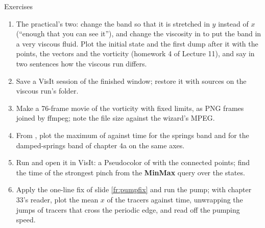 \documentclass[aspectratio=169,11pt]{beamer}
\newcommand{\gui}[1]{\textsf{\textbf{#1}}}
\begin{document}
\begin{frame}{Exercises}
\label{fr:exercises}
\small
\begin{enumerate}
  \item The practical's two: change the band so that it is stretched in $y$ instead of $x$ (``enough that you can see it''), and change the viscosity in  to put the band in a very viscous fluid. Plot the initial state and the first dump after it with the points, the vectors and the vorticity (homework 4 of Lecture 11), and say in two sentences how the viscous run differs.
  \item Save a VisIt session of the finished window; restore it with sources on the viscous run's folder.
  \item Make a 76-frame movie of the vorticity with fixed limits, as PNG frames joined by ffmpeg; note the file size against the wizard's MPEG.
  \item From , plot the maximum of  against time for the springs band and for the damped-springs band of chapter 4a on the same axes.
  \item Run  and open it in VisIt: a Pseudocolor of  with the connected points; find the time of the strongest pinch from the \gui{MinMax} query over the states.
  \item Apply the one-line fix of slide \ref{fr:pumpfix} and run the pump; with chapter 33's reader, plot the mean $x$ of the tracers against time, unwrapping the jumps of tracers that cross the periodic edge, and read off the pumping speed.
\end{enumerate}
\end{frame}
\end{document}
